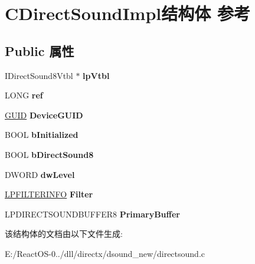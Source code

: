 \hypertarget{struct_c_direct_sound_impl}{}\section{C\+Direct\+Sound\+Impl结构体 参考}
\label{struct_c_direct_sound_impl}
\subsection*{Public 属性}
\begin{DoxyCompactItemize}
\item 
\mbox{\label{struct_c_direct_sound_impl_a3e54413ad78b7184590ea7afa4aebcd1}} 
I\+Direct\+Sound8\+Vtbl $\ast$ {\bfseries lp\+Vtbl}
\item 
\mbox{\label{struct_c_direct_sound_impl_abc94958ec71c2570077bf4c2d6353486}} 
L\+O\+NG {\bfseries ref}
\item 
\mbox{\label{struct_c_direct_sound_impl_aa572571a839488624477600fa58d4794}} 
\hyperlink{interface_g_u_i_d}{G\+U\+ID} {\bfseries Device\+G\+U\+ID}
\item 
\mbox{\label{struct_c_direct_sound_impl_a0ee8f7d9fc99f5d4888d70bff45e874e}} 
B\+O\+OL {\bfseries b\+Initialized}
\item 
\mbox{\label{struct_c_direct_sound_impl_a4539d99b255062644001df036b928e08}} 
B\+O\+OL {\bfseries b\+Direct\+Sound8}
\item 
\mbox{\label{struct_c_direct_sound_impl_a9c99b8b02e1325f0f7e62f6af8c4c6ea}} 
D\+W\+O\+RD {\bfseries dw\+Level}
\item 
\mbox{\label{struct_c_direct_sound_impl_a91bef275b6efa62338cb85d776701e69}} 
\hyperlink{structtag_f_i_l_t_e_r_i_n_f_o}{L\+P\+F\+I\+L\+T\+E\+R\+I\+N\+FO} {\bfseries Filter}
\item 
\mbox{\label{struct_c_direct_sound_impl_ac934c6bc41868e0da4c113bb81871d0e}} 
L\+P\+D\+I\+R\+E\+C\+T\+S\+O\+U\+N\+D\+B\+U\+F\+F\+E\+R8 {\bfseries Primary\+Buffer}
\end{DoxyCompactItemize}


该结构体的文档由以下文件生成\+:\begin{DoxyCompactItemize}
\item 
E\+:/\+React\+O\+S-\/0../dll/directx/dsound\+\_\+new/directsound.\+c\end{DoxyCompactItemize}
